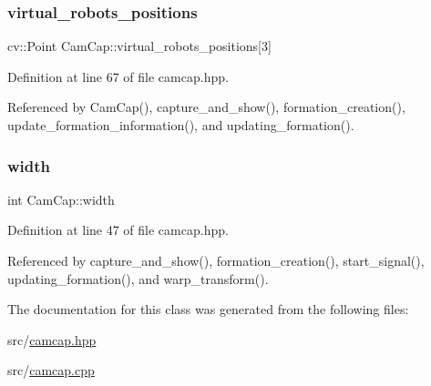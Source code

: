 \subsubsection{\texorpdfstring{virtual\+\_\+robots\+\_\+positions}{virtual\_robots\_positions}}
{\footnotesize\ttfamily cv\+::\+Point Cam\+Cap\+::virtual\+\_\+robots\+\_\+positions\mbox{[}3\mbox{]}}



Definition at line 67 of file camcap.\+hpp.



Referenced by Cam\+Cap(), capture\+\_\+and\+\_\+show(), formation\+\_\+creation(), update\+\_\+formation\+\_\+information(), and updating\+\_\+formation().

\mbox{\label{class_cam_cap_ac22698ba7ba278ffd8f7af7bd86a62c9}} 
\subsubsection{\texorpdfstring{width}{width}}
{\footnotesize\ttfamily int Cam\+Cap\+::width}



Definition at line 47 of file camcap.\+hpp.



Referenced by capture\+\_\+and\+\_\+show(), formation\+\_\+creation(), start\+\_\+signal(), updating\+\_\+formation(), and warp\+\_\+transform().



The documentation for this class was generated from the following files\+:\begin{DoxyCompactItemize}
\item 
src/\hyperlink{camcap_8hpp}{camcap.\+hpp}\item 
src/\hyperlink{camcap_8cpp}{camcap.\+cpp}\end{DoxyCompactItemize}
